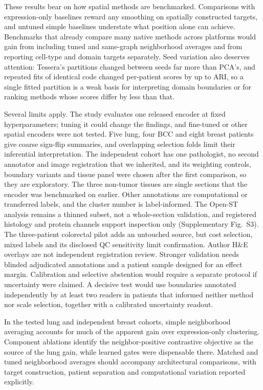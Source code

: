 \documentclass[11pt]{article}
\begin{document}
These results bear on how spatial methods are benchmarked. Comparisons with expression-only baselines reward any smoothing on spatially constructed targets, and untuned simple baselines understate what position alone can achieve. Benchmarks that already compare many native methods across platforms \citep{yuan2024benchmark,kang2025nar,chen2025imeta} would gain from including tuned and same-graph neighborhood averages and from reporting cell-type and domain targets separately. Seed variation also deserves attention: Tessera's partitions changed between seeds far more than PCA's, and repeated fits of identical code changed per-patient scores by up to \RepMaxRange{} ARI, so a single fitted partition is a weak basis for interpreting domain boundaries or for ranking methods whose scores differ by less than that.

Several limits apply. The study evaluates one released encoder at fixed hyperparameters; tuning it could change the findings, and fine-tuned or other spatial encoders were not tested. Five lung, four BCC and eight breast patients give coarse sign-flip summaries, and overlapping selection folds limit their inferential interpretation. The independent cohort has one pathologist, no second annotator and image registration that we inherited, and its weighting controls, boundary variants and tissue panel were chosen after the first comparison, so they are exploratory. The three non-tumor tissues are single sections that the encoder was benchmarked on earlier. Other annotations are computational or transferred labels, and the cluster number is label-informed. The Open-ST analysis remains a thinned subset, not a whole-section validation, and registered histology and protein channels support inspection only (Supplementary Fig.~S3). The three-patient colorectal pilot adds an untouched source, but cost selection, mixed labels and its disclosed QC sensitivity limit confirmation. Author H\&E overlays are not independent registration review. Stronger validation needs blinded adjudicated annotations and a patient sample designed for an effect margin. Calibration and selective abstention would require a separate protocol if uncertainty were claimed. A decisive test would use boundaries annotated independently by at least two readers in patients that informed neither method nor scale selection, together with a calibrated uncertainty readout.

In the tested lung and independent breast cohorts, simple neighborhood averaging accounts for much of the apparent gain over expression-only clustering. Component ablations identify the neighbor-positive contrastive objective as the source of the lung gain, while learned gates were dispensable there. Matched and tuned neighborhood averages should accompany architectural comparisons, with target construction, patient separation and computational variation reported explicitly.
\end{document}
